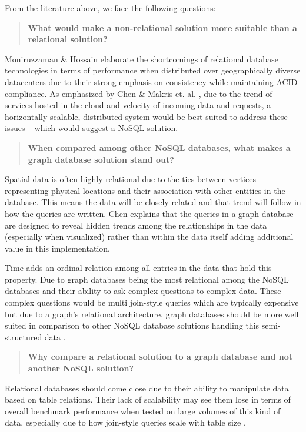 From the literature above, we face the following questions:

\begin{quote}
    \textbf{What would make a non-relational solution more suitable than a relational solution?}
\end{quote}

Moniruzzaman \& Hossain \cite{nosql-db} elaborate the shortcomings of relational database technologies in terms of performance when distributed over geographically diverse datacenters due to their strong emphasis on consistency while maintaining ACID-compliance. As emphasized by Chen \cite{socialdata} \& Makris et. al. \cite{mongovspostgres}, due to the trend of services hosted in the cloud and velocity of incoming data and requests, a horizontally scalable, distributed system would be best suited to address these issues -- which would suggest a NoSQL solution.

\begin{quote}
    \textbf{When compared among other NoSQL databases, what makes a graph database solution stand out?}
\end{quote}

Spatial data is often highly relational due to the ties between vertices representing physical locations and their association with other entities in the database. This means the data will be closely related and that trend will follow in how the queries are written. Chen \cite{socialdata} explains that the queries in a graph database are designed to reveal hidden trends among the relationships in the data (especially when visualized) rather than within the data itself adding additional value in this implementation.

Time adds an ordinal relation among all entries in the data that hold this property. Due to graph databases being the most relational among the NoSQL databases and their ability to ask complex questions to complex data. These complex questions would be multi join-style queries which are typically expensive but due to a graph's relational architecture, graph databases should be more well suited in comparison to other NoSQL database solutions handling this semi-structured data \cite{data-in-nosql}.

\begin{quote}
    \textbf{Why compare a relational solution to a graph database and not another NoSQL solution?}
\end{quote}

Relational databases should come close due to their ability to manipulate data based on table relations. Their lack of scalability may see them lose in terms of overall benchmark performance when tested on large volumes of this kind of data, especially due to how join-style queries scale with table size \cite{data-in-nosql}.

